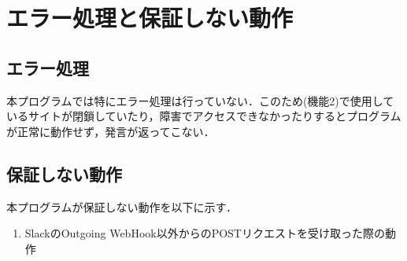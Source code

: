 \documentclass[12pt]{jsarticle}
\begin{document}
\section{エラー処理と保証しない動作}
\subsection{エラー処理}
本プログラムでは特にエラー処理は行っていない．このため(機能2)で使用しているサイトが閉鎖していたり，障害でアクセスできなかったりするとプログラムが正常に動作せず，発言が返ってこない．

\subsection{保証しない動作}
本プログラムが保証しない動作を以下に示す．
\begin{enumerate}
\item SlackのOutgoing WebHook以外からのPOSTリクエストを受け取った際の動作
\end{enumerate}


%
\end{document}
